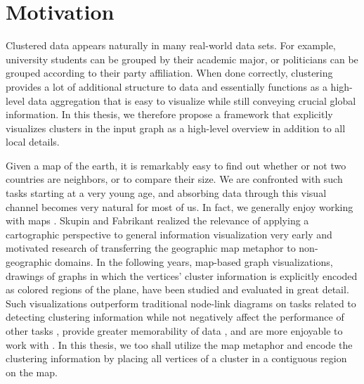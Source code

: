 \section{Motivation}
\label{sect:motivation}

Clustered data appears naturally in many real-world data sets. For example, university students can be grouped by their academic major, or politicians can be grouped according to their party affiliation. When done correctly, clustering provides a lot of additional structure to data and essentially functions as a high-level data aggregation that is easy to visualize while still conveying crucial global information.
In this thesis, we therefore propose a framework that explicitly visualizes clusters in the input graph as a high-level overview in addition to all local details.

Given a map of the earth, it is remarkably easy to find out whether or not two countries are neighbors, or to compare their size. We are confronted with such tasks starting at a very young age, and absorbing data through this visual channel becomes very natural for most of us. In fact, we generally enjoy working with maps \cite{saket2016comparing}. Skupin and Fabrikant \cite{skupin2003spatialization} realized the relevance of applying a cartographic perspective to general information visualization very early and motivated research of transferring the geographic map metaphor to non-geographic domains. In the following years, map-based graph visualizations, \ie{} drawings of graphs in which the vertices' cluster information is explicitly encoded as colored regions of the plane, have been studied and evaluated in great detail. Such visualizations outperform traditional node-link diagrams on tasks related to detecting clustering information while not negatively affect the performance of other tasks \cite{saket2014node}, provide greater memorability of data \cite{saket2015map}, and are more enjoyable to work with \cite{saket2016comparing}.
In this thesis, we too shall utilize the map metaphor and encode the clustering information by placing all vertices of a cluster in a contiguous region on the map.


